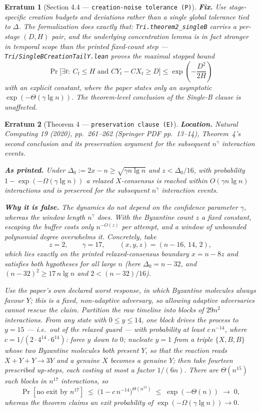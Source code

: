 \documentclass[11pt]{article}
\theoremstyle{erratumstyle}
\newtheorem{erratum}{Erratum}
\newcommand{\lgn}{\lg n}
\begin{document}
\begin{erratum}[Section 4.4 --- \texttt{creation-noise tolerance (P)}]
\medskip
\textbf{Fix.} Use stage-specific creation budgets and deviations rather than a
single global tolerance tied to $\Delta$. The formalization does exactly that:
\texttt{Tri.theorem2\_singleB} carries a per-stage $(D,H)$ pair, and the
underlying concentration lemma is in fact \emph{stronger} in temporal scope than
the printed fixed-count step --- \texttt{Tri/SingleBCreationTailY.lean} proves
the maximal stopped bound
\[
  \Pr\bigl[\exists t:\ C_t \le H \text{ and } CY_t - CX_t \ge D\bigr]
    \le \exp\!\left(-\frac{D^2}{2H}\right)
\]
with an explicit constant, where the paper states only an asymptotic
$\exp(-\Theta(\gamma\lgn))$. The theorem-level conclusion of the Single-B clause
is unaffected.
\end{erratum}

\begin{erratum}[Theorem 4 --- \texttt{preservation clause (E)}]
\textbf{Location.} \emph{Natural Computing} 19 (2020), pp.~261--262
(Springer PDF pp.~13--14), Theorem~4's second conclusion and its preservation
argument for the subsequent $n^{\gamma}$ interaction events.

\medskip
\textbf{As printed.} Under $\Delta_0 := 2x-n \ge \sqrt{\gamma n\lgn}$ and
$z < \Delta_0/16$, with probability $1-\exp(-\Omega(\gamma\lgn))$ a relaxed
$X$-consensus is reached within $O(\gamma n\lgn)$ interactions \emph{and is
preserved for the subsequent $n^{\gamma}$ interaction events}.

\medskip
\textbf{Why it is false.} The dynamics do not depend on the confidence
parameter $\gamma$, whereas the window length $n^{\gamma}$ does. With the
Byzantine count $z$ a fixed constant, escaping the buffer costs only
$n^{-O(z)}$ per attempt, and a window of unbounded polynomial degree
overwhelms it. Concretely, take
\[
  z = 2,\qquad \gamma = 17,\qquad (x,y,z) = (n-16,\,14,\,2),
\]
which lies exactly on the printed relaxed-consensus boundary $x = n-8z$ and
satisfies both hypotheses for all large $n$ (here $\Delta_0 = n-32$, and
$(n-32)^2 \ge 17\,n\lgn$ and $2 < (n-32)/16$).

Use the paper's own declared worst response, in which Byzantine molecules
always favour $Y$; this is a \emph{fixed, non-adaptive} adversary, so allowing
adaptive adversaries cannot rescue the claim. Partition the raw timeline into
blocks of $29n^2$ interactions. From any state with $0\le y\le 14$, one block
drives the process to $y=15$ --- i.e.\ out of the relaxed guard --- with
probability at least $c\,n^{-14}$, where $c = 1/(2\cdot 4^{14}\cdot 6^{14})$:
force $y$ down to $0$; nucleate $y=1$ from a triple $\{X,B,B\}$ whose two
Byzantine molecules both present $Y$, so that the reaction reads
$X+Y+Y\to 3Y$ and a genuine $X$ becomes a genuine $Y$; then take fourteen
prescribed up-steps, each costing at most a factor $1/(6n)$. There are
$\Theta(n^{15})$ such blocks in $n^{17}$ interactions, so
\[
  \Pr[\text{no exit by } n^{17}]
  \;\le\; \bigl(1-c\,n^{-14}\bigr)^{\Theta(n^{15})}
  \;\le\; \exp(-\Theta(n)) \;\longrightarrow\; 0,
\]
whereas the theorem claims an exit probability of
$\exp(-\Omega(\gamma\lgn))\to 0$.


\end{erratum}
\end{document}
